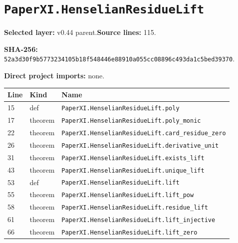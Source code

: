 \documentclass[10pt,oneside]{book}
\begin{document}
\section{\texorpdfstring{\nolinkurl{PaperXI.HenselianResidueLift}}{PaperXI.HenselianResidueLift}}\label{module:PaperXI.HenselianResidueLift}

\textbf{Selected layer:} v0.44 parent.\quad\textbf{Source lines:} 115.\par\textbf{SHA-256:} {\scriptsize\nolinkurl{52a3d30f9b5773234105b18f548446e88910a055cc08896c493da1c5bed39370}}.


\textbf{Direct project imports:} none.

\begin{longtable}{@{}p{}p{}p{}@{}}\toprule Line&Kind&Name\\\midrule\endhead

15&def&\nolinkurl{PaperXI.HenselianResidueLift.poly}\\

17&theorem&\nolinkurl{PaperXI.HenselianResidueLift.poly_monic}\\

22&theorem&\nolinkurl{PaperXI.HenselianResidueLift.card_residue_zero}\\

26&theorem&\nolinkurl{PaperXI.HenselianResidueLift.derivative_unit}\\

31&theorem&\nolinkurl{PaperXI.HenselianResidueLift.exists_lift}\\

43&theorem&\nolinkurl{PaperXI.HenselianResidueLift.unique_lift}\\

53&def&\nolinkurl{PaperXI.HenselianResidueLift.lift}\\

55&theorem&\nolinkurl{PaperXI.HenselianResidueLift.lift_pow}\\

58&theorem&\nolinkurl{PaperXI.HenselianResidueLift.residue_lift}\\

61&theorem&\nolinkurl{PaperXI.HenselianResidueLift.lift_injective}\\

66&theorem&\nolinkurl{PaperXI.HenselianResidueLift.lift_zero}\\


\end{longtable}
\end{document}
